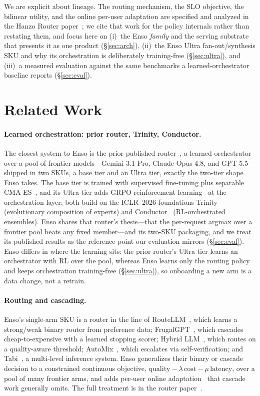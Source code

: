 \documentclass[11pt]{article}
\begin{document}
We are explicit about lineage. The routing mechanism, the SLO objective, the
bilinear utility, and the online per-user adaptation are specified and analyzed in
the Hanzo Router paper~\cite{hanzorouterpaper}; we cite that work for the policy
internals rather than restating them, and focus here on (i)~the Enso \emph{family}
and the serving substrate that presents it as one product (\S\ref{sec:arch}),
(ii)~the Enso Ultra fan-out/synthesis SKU and why its orchestration is deliberately
training-free (\S\ref{sec:ultra}), and (iii)~a measured evaluation against the same
benchmarks a learned-orchestrator baseline reports (\S\ref{sec:eval}).

\section{Related Work}
\label{sec:related}

\paragraph{Learned orchestration: prior router, Trinity, Conductor.} The closest
system to Enso is the prior published router~\cite{priororchestrator}, a learned
orchestrator over a pool of frontier models---Gemini 3.1 Pro, Claude Opus 4.8, and
GPT-5.5---shipped in two SKUs, a base tier and an Ultra tier, exactly the two-tier
shape Enso takes. The base tier is trained with supervised fine-tuning plus
separable CMA-ES~\cite{sepcmaes}, and its Ultra tier adds GRPO reinforcement
learning~\cite{grpo} at the orchestration layer; both build on the ICLR~2026
foundations Trinity~\cite{trinity} (evolutionary composition of experts) and
Conductor~\cite{conductor} (RL-orchestrated ensembles). Enso shares that router's
thesis---that the per-request argmax over a frontier pool beats any fixed
member---and its two-SKU packaging, and we treat its published results as the
reference point our evaluation mirrors (\S\ref{sec:eval}). Enso differs in where
the learning sits: the prior router's Ultra tier learns an orchestrator with RL
over the pool, whereas Enso learns only the routing policy and keeps orchestration
training-free (\S\ref{sec:ultra}), so onboarding a new arm is a data change, not a
retrain.

\paragraph{Routing and cascading.} Enso's single-arm SKU is a router in the line of
RouteLLM~\cite{routellm}, which learns a strong/weak binary router from preference
data; FrugalGPT~\cite{frugalgpt}, which cascades cheap-to-expensive with a learned
stopping scorer; Hybrid LLM~\cite{hybridllm}, which routes on a quality-aware
threshold; AutoMix~\cite{automix}, which escalates via self-verification; and
Tabi~\cite{tabi}, a multi-level inference system. Enso generalizes their binary or
cascade decision to a constrained continuous objective,
$\mathrm{quality}-\lambda\,\mathrm{cost}-\mu\,\mathrm{latency}$, over a pool of many
frontier arms, and adds per-user online adaptation~\cite{linucb} that cascade work
generally omits. The full treatment is in the router paper~\cite{hanzorouterpaper}.
\end{document}
